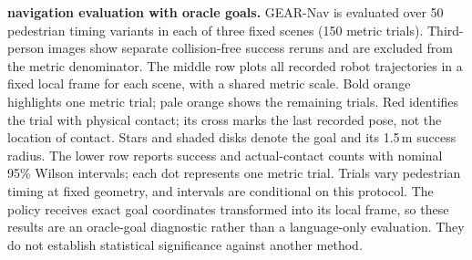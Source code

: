 \textbf{navigation evaluation with oracle goals.}
GEAR-Nav is evaluated over 50 pedestrian timing variants in each of three
fixed scenes (150 metric trials). Third-person images show separate
collision-free success reruns and are excluded from the metric denominator.
The middle row plots all recorded robot trajectories in a fixed local frame
for each scene, with a shared metric scale. Bold orange highlights one metric
trial; pale orange shows the remaining trials. Red identifies the trial with
physical contact; its cross marks the last recorded pose, not the location of
contact. Stars and shaded disks denote the goal and its 1.5\,m success radius.
The lower row reports success and actual-contact counts with nominal 95\%
Wilson intervals; each dot represents one metric trial. Trials vary
pedestrian timing at fixed geometry, and intervals are conditional on this
protocol. The policy receives exact goal coordinates transformed
into its local frame, so these results are an oracle-goal diagnostic rather
than a language-only evaluation. They do not establish statistical
significance against another method.
